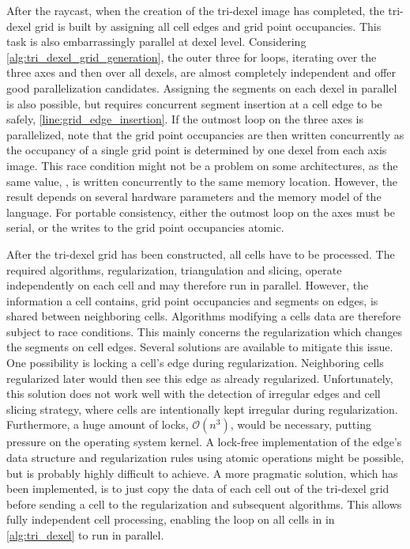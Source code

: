 After the raycast, when the creation of the tri-dexel image has completed, the tri-dexel grid is built by assigning all cell edges and grid point occupancies.
This task is also embarrassingly parallel at dexel level.
Considering \cref{alg:tri_dexel_grid_generation}, the outer three for loops, iterating over the three axes and then over all dexels, are almost completely independent and offer good parallelization candidates.
Assigning the segments on each dexel in parallel is also possible, but requires concurrent segment insertion at a cell edge to be safely, \cf \cref{line:grid_edge_insertion}.
If the outmost loop on the three axes is parallelized, note that the grid point occupancies are then written concurrently as the occupancy of a single grid point is determined by one dexel from each axis image.
This race condition might not be a problem on some architectures, as the same value, \True, is written concurrently to the same memory location.
However, the result depends on several hardware parameters and the memory model of the language.
For portable consistency, either the outmost loop on the axes must be serial, or the writes to the grid point occupancies atomic.

After the tri-dexel grid has been constructed, all cells have to be processed.
The required algorithms, \ie regularization, triangulation and slicing, operate independently on each cell and may therefore run in parallel.
However, the information a cell contains, \ie grid point occupancies and segments on edges, is shared between neighboring cells.
Algorithms modifying a cells data are therefore subject to race conditions.
This mainly concerns the regularization which changes the segments on cell edges.
Several solutions are available to mitigate this issue.
One possibility is locking a cell's edge during regularization.
Neighboring cells regularized later would then see this edge as already regularized.
Unfortunately, this solution does not work well with the detection of irregular edges and cell slicing strategy, where cells are intentionally kept irregular during regularization.
Furthermore, a huge amount of locks, $\mathcal{O}(n^3)$, would be necessary, putting pressure on the operating system kernel.
A lock-free implementation of the edge's data structure and regularization rules using atomic operations might be possible, but is probably highly difficult to achieve.
A more pragmatic solution, which has been implemented, is to just copy the data of each cell out of the tri-dexel grid before sending a cell to the regularization and subsequent algorithms.
This allows fully independent cell processing, enabling the loop on all cells in  in \cref{alg:tri_dexel} to run in parallel.

